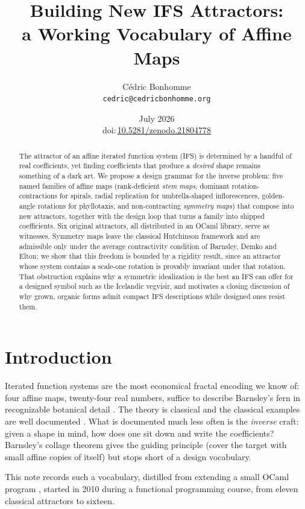 \documentclass[11pt,a4paper]{article}
\title{Building New IFS Attractors:\\ a Working Vocabulary of Affine Maps}
\author{Cédric Bonhomme\\ \small\texttt{cedric@cedricbonhomme.org}}
\date{July 2026\\[0.6em]
  \small doi:\,\href{https://doi.org/10.5281/zenodo.21804778}%
  {10.5281/zenodo.21804778}}
\theoremstyle{remark}
\begin{document}
\maketitle

\begin{abstract}
The attractor of an affine iterated function system (IFS) is determined by a
handful of real coefficients, yet finding coefficients that produce a
\emph{desired} shape remains something of a dark art. We propose a design
grammar for the inverse problem: five named families of affine maps
(rank-deficient \emph{stem maps}, dominant rotation-contractions for spirals,
radial replication for umbrella-shaped inflorescences, golden-angle rotations
for phyllotaxis, and non-contracting \emph{symmetry maps}) that compose into
new attractors, together with the design loop that turns a family into
shipped coefficients. Six original attractors, all distributed in an OCaml
library, serve as witnesses. Symmetry maps leave the classical Hutchinson
framework and are admissible only under the average contractivity condition
of Barnsley, Demko and Elton; we show that this freedom is bounded by a
rigidity result, since an attractor whose system contains a scale-one
rotation is provably invariant under that rotation. That obstruction explains
why a symmetric idealization is the best an IFS can offer for a designed
symbol such as the Icelandic vegvísir, and motivates a closing discussion of
why grown, organic forms admit compact IFS descriptions while designed ones
resist them.
\end{abstract}

\section{Introduction}

Iterated function systems are the most economical fractal encoding we know
of: four affine maps, twenty-four real numbers, suffice to describe
Barnsley's fern in recognizable botanical detail
\cite{barnsleydemko1985,barnsley1988}. The theory is classical
\cite{hutchinson1981,falconer1990} and the classical examples are
well documented \cite{vrscay,sester2017}. What is documented much less often
is the \emph{inverse} craft: given a shape in mind, how does one sit down and
write the coefficients? Barnsley's collage theorem \cite{barnsley1988} gives
the guiding principle (cover the target with small affine copies of itself)
but stops short of a design vocabulary.

This note records such a vocabulary, distilled from extending a small OCaml
program \cite{ifsfractals2026}, started in 2010 during a functional
programming course, from eleven classical attractors to sixteen.
\end{document}

